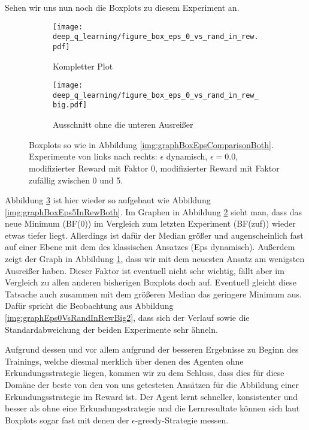 Sehen wir uns nun noch die Boxplots zu diesem Experiment an.
\begin{figure}[h!]
    \centering
    \begin{subfigure}[b]{0.7\textwidth}
        \texttt{[image: deep\_q\_learning/figure\_box\_eps\_0\_vs\_rand\_in\_rew.pdf]}
        \caption{Kompletter Plot}
        \label{img:graphBoxEps0VsRandInRew}
    \end{subfigure}
    \begin{subfigure}[b]{0.7\textwidth}
        \texttt{[image: deep\_q\_learning/figure\_box\_eps\_0\_vs\_rand\_in\_rew\_big.pdf]}
        \caption{Ausschnitt ohne die unteren Ausreißer}
        \label{img:graphBoxEps0VsRandInRewBig}
    \end{subfigure}
    \caption{Boxplots so wie in Abbildung \ref{img:graphBoxEpsComparisonBoth}. Experimente von links nach rechts: $ \epsilon $ dynamisch, $ \epsilon = 0.0 $, modifizierter Reward mit Faktor 0, modifizierter Reward mit Faktor zufällig zwischen 0 und 5.}
    \label{img:graphBoxEps0VsRandInRewBoth}
\end{figure}
Abbildung \ref{img:graphBoxEps0VsRandInRewBoth} ist hier wieder so aufgebaut wie Abbildung \ref{img:graphBoxEps5InRewBoth}. Im Graphen in Abbildung \ref{img:graphBoxEps0VsRandInRewBig} sieht man, dass das neue Minimum (BF(0)) im Vergleich zum letzten Experiment (BF(zuf)) wieder etwas tiefer liegt. Allerdings ist dafür der Median größer und augenscheinlich fast auf einer Ebene mit dem des klassischen Ansatzes (Eps dynamisch). Außerdem zeigt der Graph in Abbildung \ref{img:graphBoxEps0VsRandInRew}, dass wir mit dem neuesten Ansatz am wenigsten Ausreißer haben. Dieser Faktor ist eventuell nicht sehr wichtig, fällt aber im Vergleich zu allen anderen bisherigen Boxplots doch auf. Eventuell gleicht diese Tatsache auch zusammen mit dem größeren Median das geringere Minimum aus. Dafür spricht die Beobachtung aus Abbildung \ref{img:graphEps0VsRandInRewBig2}, dass sich der Verlauf sowie die Standardabweichung der beiden Experimente sehr ähneln.

Aufgrund dessen und vor allem aufgrund der besseren Ergebnisse zu Beginn des Trainings, welche diesmal merklich über denen des Agenten ohne Erkundungsstrategie liegen, kommen wir zu dem Schluss, dass dies für diese Domäne der beste von den von uns getesteten Ansätzen für die Abbildung einer Erkundungsstrategie im Reward ist. Der Agent lernt schneller, konsistenter und besser als ohne eine Erkundungsstrategie und die Lernresultate können sich laut Boxplots sogar fast mit denen der $ \epsilon $-greedy-Strategie messen.